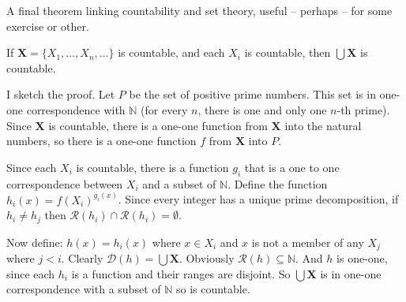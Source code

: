A final theorem linking countability and set theory, useful – perhaps – for some exercise or other.
\begin{theorem}\label{countu}
	If $\mathbf{X} = \{X_{1},\ldots,X_{n},\ldots\}$ is countable, and each $X_{i}$ is countable, then $\bigcup \mathbf{X}$ is countable.
\end{theorem}
I sketch the proof.
Let $P$ be the set of positive prime numbers. This set is in one-one correspondence with $\mathbb{N}$ (for every $n$, there is one and only one $n$-th prime). Since $\mathbf{X}$ is countable, there is a one-one function from $\mathbf{X}$ into the natural numbers, so there is a one-one function $f$ from $\mathbf{X}$ into $P$.

Since each $X_{i}$ is countable, there is a function $g_{i}$ that is a one to one correspondence between $X_{i}$ and a subset of $\mathbb{N}$. Define the function $h_{i}(x) = f(X_{i})^{g_{i}(x)}$. Since every integer has a unique prime decomposition, if $h_{i}\neq h_{j}$ then $\mathcal{R}(h_{i})\cap\mathcal{R}(h_{i})=\emptyset.$

Now define: $h(x) = h_i(x)$ where $x\in X_i$ and $x$ is not a member of any $X_{j}$ where $j < i$. Clearly $\mathcal{D}(h) = \bigcup\mathbf{X}$. Obviously $\mathcal{R}(h) \subseteq \mathbb{N}$. And $h$ is one-one, since each $h_{i}$ is a function and their ranges are disjoint. So $\bigcup\mathbf{X}$ is in one-one correspondence with a subset of $\mathbb{N}$ so is countable. 

